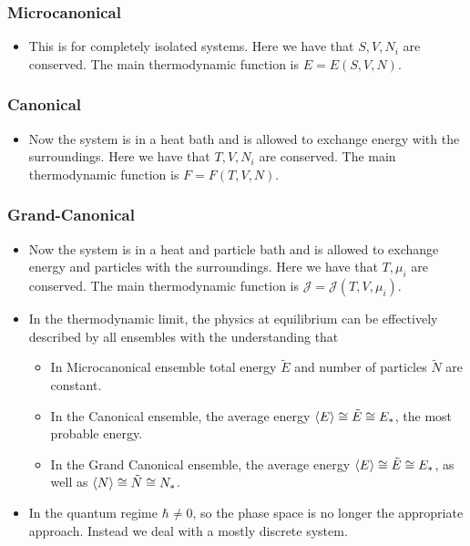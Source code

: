 \documentclass[11pt]{article}
\DeclareRobustCommand{\t}{\tilde}
\numberwithin{equation}{section}
\begin{document}
\subsubsection{Microcanonical}
\begin{itemize}
    \item This is for completely isolated systems. Here we have that $S,V,N_i$ are conserved. The main thermodynamic function is $E=E(S,V,N)$. 
\end{itemize}
\subsubsection{Canonical}
\begin{itemize}
    \item Now the system is in a heat bath and is allowed to exchange energy with the surroundings. Here we have that $T,V,N_i$ are conserved. The main thermodynamic function is $F=F(T,V,N)$. 
    \end{itemize}
\subsubsection{Grand-Canonical}
\begin{itemize}
    \item Now the system is in a heat and particle bath and is allowed to exchange energy and particles with the surroundings. Here we have that $T,\mu_i$ are conserved. The main thermodynamic function is $\mathcal{J}=\mathcal{J}(T,V,\mu_i)$.  
    \end{itemize}
\begin{itemize}
    \item In the thermodynamic limit, the physics at equilibrium can be effectively described by all ensembles with the understanding that 
\begin{itemize}
    \item In Microcanonical ensemble total energy $\tilde{E}$ and number of particles $\tilde{N}$ are constant. 
    \item In the Canonical ensemble, the average energy $\braket{E}\cong \t E  \cong E_{\ast}$, the most probable energy. 
    \item In the Grand Canonical ensemble, the average energy $\braket{E}\cong \t E  \cong E_{\ast}$, as well as  $\braket{N}\cong \t N  \cong N_{\ast}$. 


\end{itemize}
\item In the quantum regime $\hbar \neq 0$, so the phase space is no longer the appropriate approach. Instead we deal with a mostly discrete system. 

\end{itemize}
\end{document}
